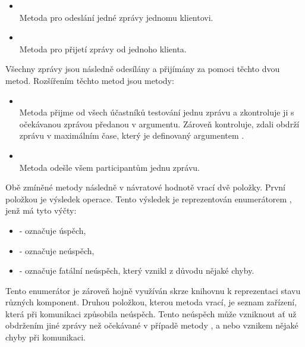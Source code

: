 \begin{itemize}
    \item {} \\
    Metoda pro odeslání jedné zprávy jednomu klientovi.
    \item {} \\
    Metoda pro přijetí zprávy od jednoho klienta.
\end{itemize}

Všechny zprávy jsou následně odesílány a přijímány za pomoci těchto dvou metod. Rozšířením těchto metod jsou metody:

 {
    \setlength{\emergencystretch}{3em} 
    \begin{itemize}
        \item {} \\
        Metoda přijme od všech účastníků testování jednu zprávu a zkontroluje ji s očekávanou zprávou předanou v argumentu. Zároveň kontroluje, zdali obdrží zprávu v maximálním čase, který je definovaný argumentem . 
        \item {} \\
        Metoda odešle všem participantům jednu zprávu.
    \end{itemize}
 }

Obě zmíněné metody následně v návratové hodnotě vrací dvě položky. První položkou je výsledek operace. Tento výsledek je reprezentován enumerátorem , jenž má tyto výčty:

\begin{itemize}
    \item {} - označuje úspěch,
    \item {} - označuje neúspěch,
    \item {} - označuje fatální neúspěch, který vznikl z důvodu nějaké chyby.
\end{itemize}

Tento enumerátor je zároveň hojně využíván skrze knihovnu k reprezentaci stavu různých komponent. Druhou položkou, kterou metoda vrací, je seznam zařízení, která při komunikaci způsobila neúspěch. Tento neúspěch může vzniknout ať už obdržením jiné zprávy než očekávané v případě metody , a nebo vznikem nějaké chyby při komunikaci.

